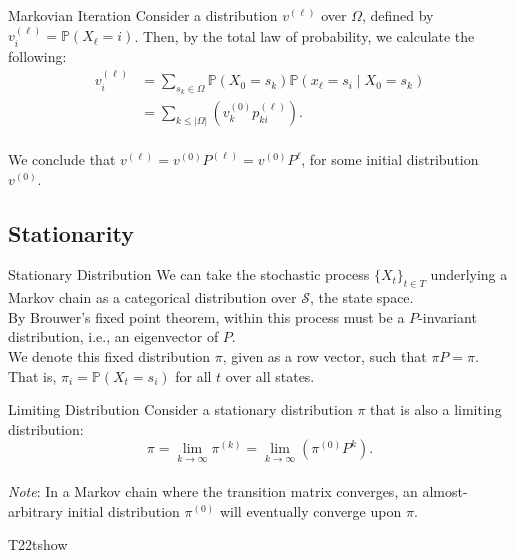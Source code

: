 \documentclass{beamer}
\newcommand{\iter}[2]{#1^{(#2)}}
\newcommand{\iter}[2]{#1^{(#2)}}
\newcommand{\parens}[1]{ \left( #1 \right) }
\newcommand{\prob}{\mathbb{P}}
\begin{document}
\begin{frame}{Markovian Iteration}
    Consider a distribution $\iter{v}{\ell}$ over $\Omega$, defined by $\iter{v}{\ell}_i = \prob(X_\ell = i)$. Then, by the total law of probability, we calculate the following:
    \begin{align*}
        \iter{v}{\ell}_i &= \sum_{s_k\in\Omega}{\prob(X_0 = s_k) \prob(x_\ell = s_i \mid X_0 = s_k)} \\
        &= \sum_{k\leq |\Omega|}{\parens{\iter{v}{0}_k \iter{p}{\ell}_{ki}}}.
    \end{align*}\\
    \vspace{2mm}
    We conclude that $\iter{v}{\ell} = \iter{v}{0} \iter{P}{\ell} = \iter{v}{0} P^\ell$, for some initial distribution $\iter{v}{0}$.
\end{frame}

\subsection{Stationarity}
\begin{frame}{Stationary Distribution}
     We can take the stochastic process $\{X_t\}_{t \in T}$ underlying a Markov chain as a categorical distribution over $\mathcal{S}$, the state space. \\
     \vspace{2mm}
     By Brouwer's fixed point theorem, within this process must be a $P$-invariant distribution, i.e., an eigenvector of $P$. \\
     \vspace{2mm}
     We denote this fixed distribution $\pi$, given as a row vector, such that $\pi P = \pi$. That is, $\pi_i = \prob(X_t = s_i)$ for all $t$ over all states.
\end{frame}

\begin{frame}{Limiting Distribution}
    Consider a stationary distribution $\pi$ that is also a limiting distribution:
	\begin{equation*}
		\pi = \lim_{k\to\infty}{{\iter{\pi}{k}}} = \lim_{k\to\infty}{\parens{{\iter{\pi}{0}} P^k}}.
	\end{equation*}\\
	\vspace{2mm}
	\textit{Note}: In a Markov chain where the transition matrix converges, an almost-arbitrary initial distribution $\iter{\pi}{0}$ will eventually converge upon $\pi$.
\end{frame}T22tshow
\end{document}

